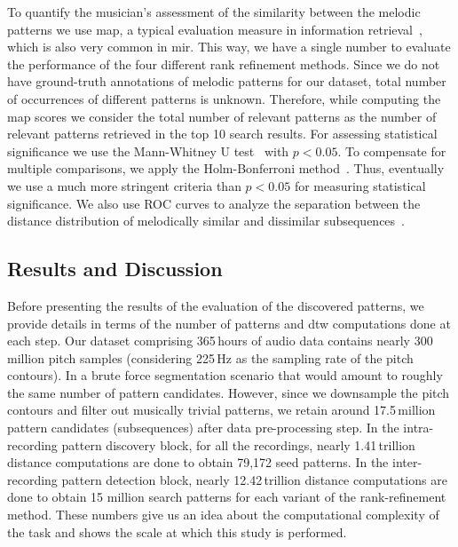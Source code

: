 To quantify the musician's assessment of the similarity between the melodic patterns  we use \gls{map}, a typical evaluation measure in information retrieval~\citep{manning2008introduction}, which is also very common in \gls{mir}. This way, we have a single number to evaluate the performance of the four different rank refinement methods. Since we do not have ground-truth annotations of melodic patterns for our dataset, total number of occurrences of different patterns is unknown. Therefore, while computing the \gls{map} scores we consider the total number of relevant patterns as the number of relevant patterns retrieved in the top 10 search results.  For assessing statistical significance we use the Mann-Whitney U test~\citep{mann1947test} with $p < 0.05$. To compensate for multiple comparisons, we apply the Holm-Bonferroni method~\citep{holm1979simple}. Thus, eventually we use a much more stringent criteria than $p < 0.05$ for measuring statistical significance. We also use ROC curves to analyze the separation between the distance distribution of melodically similar and dissimilar subsequences~\citep{manning2008introduction}. 


\subsection{Results and Discussion}
\label{sec:patterns_discovery_results}

Before presenting the results of the evaluation of the discovered patterns, we provide details in terms of the number of patterns and \gls{dtw} computations done at each step. Our dataset comprising 365\,hours of audio data contains nearly 300\,million pitch samples (considering 225\,Hz as the sampling rate of the pitch contours). In a brute force segmentation scenario that would amount to roughly the same number of pattern candidates. However, since we downsample the pitch contours and filter out musically trivial patterns, we retain around 17.5\,million pattern candidates (subsequences) after data pre-processing step. In the intra-recording pattern discovery block, for all the recordings, nearly 1.41\,trillion distance computations are done to obtain 79,172 seed patterns. In the inter-recording pattern detection block, nearly 12.42\,trillion distance computations are done to obtain 15 million search patterns for each variant of the rank-refinement method. These numbers give us an idea about the computational complexity of the task and shows the scale at which this study is performed.

